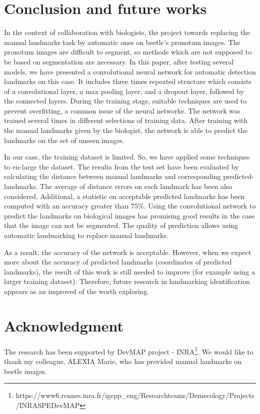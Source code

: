 \documentclass[conference]{IEEEtran}
\begin{document}
\section{Conclusion and future works}
In the context of collaboration with biologists, the project towards replacing the manual landmarks task by automatic ones on beetle's pronotum images. The pronotum images are difficult to segment, so methods which are not supposed to be based on segmentation are necessary. In this paper, after testing several models, we have presented a convolutional neural network for automatic detection landmarks on this case. It includes three times repeated structure which consists of a convolutional layer, a max pooling layer, and a dropout layer, followed by the connected layers. During the training stage, suitable techniques are used to prevent overfitting, a common issue of the neural networks. The network was trained several times in different selections of training data. After training with the manual landmarks given by the biologist, the network is able to predict the landmarks on the set of unseen images.

In our case, the training dataset is limited. So, we have applied some techniques to en-large the dataset. The results from the test set have been evaluated by calculating the distance between manual landmarks and corresponding predicted-landmarks. The average of distance errors on each landmark has been also considered. Additional, a statistic on acceptable predicted landmarks has been computed with an accuracy greater than $75\%$. Using the convolutional network to predict the landmarks on biological images has promising good results in the case that the image can not be segmented. The quality of prediction allows using automatic landmarking to replace manual landmarks. 

As a result, the accuracy of the network is acceptable. However, when we expect more about the accuracy of predicted landmarks (coordinates of predicted landmarks), the result of this work is still needed to improve (for example using a larger training dataset). Therefore, future research in landmarking identification appears as an improved of the worth exploring.
\section*{Acknowledgment}
The research has been supported by DevMAP project - INRA\footnote{https://www6.rennes.inra.fr/igepp\_eng/Research\-teams/Demecology/Projects/INRA\-SPE\-DevMAP}. We would like to thank my colleague, ALEXIA Marie, who has provided manual landmarks on beetle images.


\end{document}
